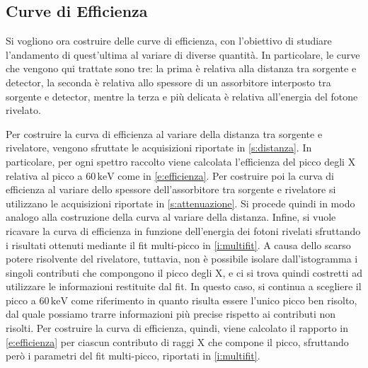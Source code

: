 \documentclass[twocolumn,10pt]{asme2ej}
\begin{document}
\subsection{Curve di Efficienza}

Si vogliono ora costruire delle curve di efficienza, con l'obiettivo di studiare l'andamento di quest'ultima al variare
di diverse quantità. In particolare, le curve che vengono qui trattate sono tre: la prima è relativa alla distanza tra
sorgente e detector, la seconda è relativa allo spessore di un assorbitore interposto tra sorgente e detector, mentre la
terza e più delicata è relativa all'energia del fotone rivelato. 

Per costruire la curva di efficienza al variare della distanza tra sorgente e rivelatore, vengono sfruttate le
acquisizioni riportate in \autoref{s:distanza}. In particolare, per ogni spettro raccolto viene calcolata l'efficienza
del picco degli X relativa al picco a $60\,\si{\kilo\electronvolt}$ come in \autoref{e:efficienza}. Per costruire poi la
curva di efficienza al variare dello spessore dell'assorbitore tra sorgente e rivelatore si utilizzano le acquisizioni
riportate in \autoref{s:attenuazione}. Si procede quindi in modo analogo alla costruzione della curva al variare della
distanza. Infine, si vuole ricavare la curva di efficienza in funzione dell'energia dei fotoni rivelati sfruttando  i
risultati ottenuti mediante il fit multi-picco in \autoref{i:multifit}. A causa dello scarso potere risolvente del
rivelatore, tuttavia, non è possibile isolare dall'istogramma i singoli contributi che compongono il picco degli X, e ci
si trova quindi costretti ad utilizzare le informazioni restituite dal fit. In questo caso, si continua a scegliere il
picco a $60\,\si{\kilo\electronvolt}$ come riferimento in quanto risulta essere l'unico picco ben risolto, dal quale
possiamo trarre informazioni più precise rispetto ai contributi non risolti. Per costruire la curva di efficienza,
quindi, viene calcolato il rapporto in \autoref{e:efficienza} per ciascun contributo di raggi X che compone il picco,
sfruttando però i parametri del fit multi-picco, riportati in \autoref{i:multifit}. 
\end{document}
